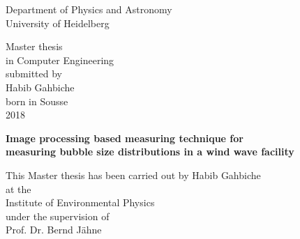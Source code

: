 
\thispagestyle{empty}
\begin{center}
  \renewcommand{\baselinestretch}{2.00}
  \Large\sffamily
  Department of Physics and Astronomy\\
  \large University of Heidelberg
  \par\vfill\normalfont
  Master thesis\\
  in Computer Engineering\\
  submitted by\\
  Habib Gahbiche\\
  born in Sousse\\
  2018
\end{center}
\newpage

\thispagestyle{empty}
\begin{center}
  \renewcommand{\baselinestretch}{2.00}
  \Large\bfseries\sffamily
    Image processing based measuring technique for\\
    measuring bubble size distributions in a wind wave facility \\
  \par
  \vfill
  \large\normalfont
  This Master thesis has been carried out by Habib Gahbiche\\
  at the\\
  Institute of Environmental Physics\\
  under the supervision of\\
  Prof. Dr. Bernd Jähne\\
\end{center}\par
\vspace{5\baselineskip}

\renewcommand{\baselinestretch}{1.00}\normalsize
